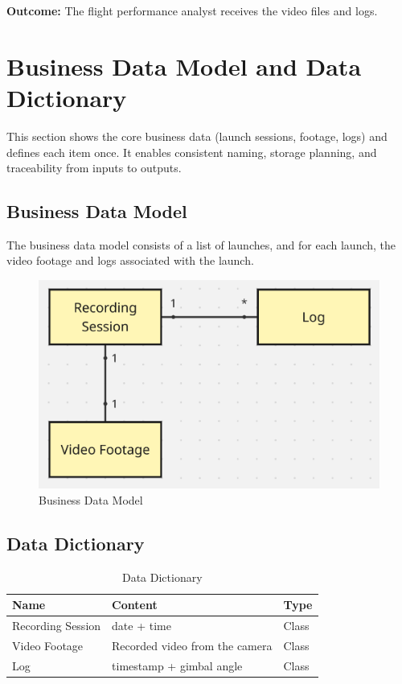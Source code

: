 \documentclass[12pt]{article}
\begin{document}
\textbf{Outcome:} The flight performance analyst receives the video files and logs.

\section{Business Data Model and Data Dictionary}
This section shows the core business data (launch sessions, footage, logs) and
defines each item once. It enables consistent naming, storage planning, and
traceability from inputs to outputs.
\subsection{Business Data Model}

The business data model consists of a list of launches, and for each launch,
the video footage and logs associated with the launch.

\begin{figure}[H]
  \centering
  \includegraphics[width=\textwidth,height=\textheight,keepaspectratio]{../Images/business_data_model.png}
  \caption{Business Data Model}
  \label{img:business-data-model}
\end{figure}

\subsection{Data Dictionary}

\begin{table}[H]
  \centering
  \setlength\extrarowheight{5mm}
  \begin{tabularx}{\textwidth}{lXp{1in}}
    \toprule \textbf{Name} & \textbf{Content}               &
    \textbf{Type}                                             \\
    \midrule
    Recording Session      & date + time                    &
    Class
    \\
    Video Footage          & Recorded video from the camera &
    Class
    \\
    Log                    & timestamp + gimbal angle       &
    Class
    \\
    \bottomrule
  \end{tabularx}
  \caption{Data Dictionary}
  \label{tab:data-dictionary}
\end{table}
\end{document}
